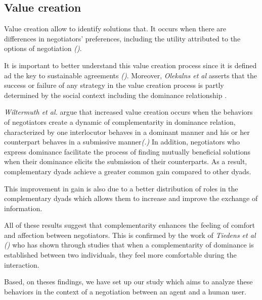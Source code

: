 \documentclass[10pt, a4paper, twocolumn]{article} %
\begin{document}
		\subsection{Value creation}
		
				Value creation  allow to identify solutions that. It occurs when there are differences in negotiators' preferences, including the utility attributed to the options of negotiation \emph{(\cite{lax1986managerial,wiltermuth2015benefits})}.
				
				It is important to better understand this value creation process since it is defined ad the key to sustainable agreements \emph{(\cite{wiltermuth2015benefits})}.
				Moreover, \emph{Olekalns et al} asserts that the success or failure of any strategy in the value creation process is partly determined by the social context including the dominance relationship \cite{olekalns2013dyadic}.
				
					\emph{Wiltermuth et al.} argue that increased value creation occurs when the behaviors of negotiators create a dynamic of complementarity in dominance relation, characterized by one interlocutor behaves in a dominant manner and his or her counterpart behaves in a submissive manner\emph{(\cite{wiltermuth2015benefits}.)} In addition, negotiators who express dominance facilitate the process of finding mutually beneficial solutions when their dominance elicits the submission of their counterparts. As a result, complementary dyads achieve a greater common gain compared to other dyads.
					
					This improvement in gain is also due to a better distribution of roles in the complementary dyads which allows them to increase and improve the exchange of information. 
					
					All of these results suggest that complementarity enhances the feeling of comfort and affection between negotiators. This is confirmed by the work of \emph {Tiedens et al} \emph{(\cite{tiedens2003power})} who has shown through studies that when a complementarity of dominance is established between two individuals, they feel more comfortable during the interaction.
					
					Based, on theses findings, we have set up our study which aims to analyze these behaviors in the context of a negotiation between an agent and a human user.

\printbibliography[title={Bibliography}] %

\end{document}
